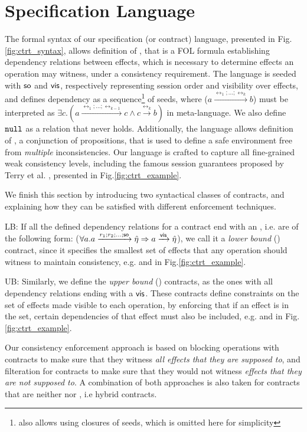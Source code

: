 \section {Specification Language} 
\label{sec:ctrt_language}

The formal syntax of our specification (or contract) language, presented in
Fig.\ref{fig:ctrt_syntax}, allows definition of
\propS{}, that is a FOL formula
establishing dependency relations between effects,
which is necessary to determine effects an operation may witness, under
a consistency requirement.
The language is seeded with ${\textsf{so}}$ and ${\normalfont \textsf{vis}}$, respectively representing session
order and visibility over effects, 
and defines dependency \relationS{} as a sequence\footnote{\tool also allows
using closures of seeds, which is omitted here for
simplicity} of seeds,  
where 
({\footnotesize $a \xrightarrow{\rel_1;...;\rel_k} b$})
must be interpreted as 
{\footnotesize$\exists c. (a
\xrightarrow{\rel_1;...;\rel_{k-1}} c
\wedge c \xrightarrow {\rel_k} b)$}
in meta-language. We also define $\mathtt{null}{}$ as a relation that never
holds.
Additionally, the language allows definition of \specS{},
a conjunction of propositions, that is used to define a safe environment
free from \emph{multiple} inconsistencies. 
Our language is crafted to capture all fine-grained weak consistency
levels, including the famous session guarantees proposed by Terry et al. \cite{terry}, presented
in Fig.\ref{fig:ctrt_example}.

%
We finish this section by introducing two syntactical classes of 
contracts, and explaining how they can be
satisfied with different enforcement techniques.
\begin{description}
\item {\textsf LB}: If all the defined dependency relations for a
contract end with an \soZ, i.e. are of
the following form: ({\footnotesize $\forall a. a
\xrightarrow{r_1;r_2;...;{\textsf{so}}} \hat{\eta}
\Rightarrow a \xrightarrow{{\normalfont \textsf{vis}}} \hat{\eta}$}), we call it a \emph{lower
bound} (\LB{}) contract, since it specifies the smallest set of
effects that any operation should witness to maintain consistency, e.g.
\rmwCTRT{} and \mrCTRT{} in Fig.\ref{fig:ctrt_example}.

\item {\textsf UB}: Similarly, we define the \emph{upper bound} (\UB{})
contracts, as the ones with all dependency relations ending with a ${\normalfont \textsf{vis}}$.
These contracts define constraints on the set of effects made visible
to each operation, by enforcing that if an effect is in the set,
certain dependencies of that effect must also be included, e.g.
\visCTRT{} and \mwCTRT{} in Fig.\ref{fig:ctrt_example}.
\end{description}
Our consistency enforcement approach is based on blocking operations with \LB{}
contracts to make sure that they witness \emph{all effects that they are
supposed to}, and filteration for \UB{} contracts to make sure that they
would not witness \emph{effects that they are not supposed
to}. A combination of both approaches is also taken for contracts that are
neither  \LB{} nor \UB{}, i.e hybrid contracts.
